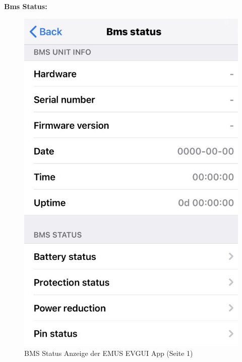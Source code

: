 \textbf{Bms Status:}
\begin{figure}[H]
	\begin{center}
		\includegraphics[scale=0.4]{figures/Akku/BMSStatus.png}
		\caption{BMS Status Anzeige der EMUS EVGUI App (Seite 1)\cite{BMSStatusApp1}}
		\label{fig: BMS Status Anzeige der EMUS EVGUI App (Seite 1)}
	\end{center}
\end{figure}
\newpage

